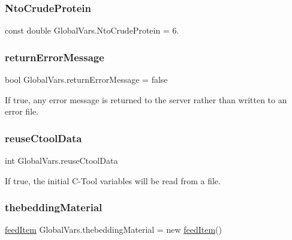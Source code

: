 \mbox{\label{class_global_vars_af457f71344887d7f092c0a8190bf47ef}} 
\subsubsection{\texorpdfstring{NtoCrudeProtein}{NtoCrudeProtein}}
{\footnotesize\ttfamily const double Global\+Vars.\+Nto\+Crude\+Protein = 6.}

\mbox{\label{class_global_vars_ac7a516010a3ce81e1fc2792807bb305d}} 
\subsubsection{\texorpdfstring{returnErrorMessage}{returnErrorMessage}}
{\footnotesize\ttfamily bool Global\+Vars.\+return\+Error\+Message = false}



If true, any error message is returned to the server rather than written to an error file. 

\mbox{\label{class_global_vars_a9b407972734f633b8f613181750a9c6a}} 
\subsubsection{\texorpdfstring{reuseCtoolData}{reuseCtoolData}}
{\footnotesize\ttfamily int Global\+Vars.\+reuse\+Ctool\+Data}



If true, the initial C-\/\+Tool variables will be read from a file. 

\mbox{\label{class_global_vars_ac5b724d8af7c0aa33718a1ed78fdfb8e}} 
\subsubsection{\texorpdfstring{thebeddingMaterial}{thebeddingMaterial}}
{\footnotesize\ttfamily \mbox{\hyperlink{classfeed_item}{feed\+Item}} Global\+Vars.\+thebedding\+Material = new \mbox{\hyperlink{classfeed_item}{feed\+Item}}()}


